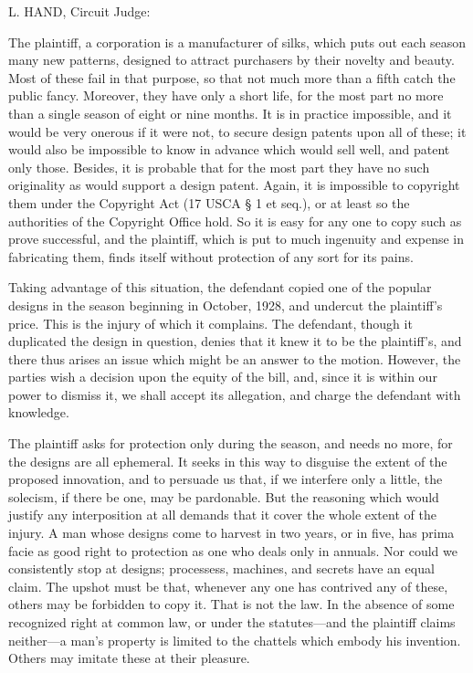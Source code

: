 
\textsc{L. HAND}, Circuit Judge:

The plaintiff, a corporation is a manufacturer of silks, which puts out each
season many new patterns, designed to attract purchasers by their novelty and
beauty.  Most of these fail in that purpose, so that not much more than a fifth
catch the public fancy.  Moreover, they have only a short life, for the most
part no more than a single season of eight or nine months.  It is in practice
impossible, and it would be very onerous if it were not, to secure design
patents upon all of these; it would also be impossible to know in advance which
would sell well, and patent only those.  Besides, it is probable that for the
most part they have no such originality as would support a design patent.
Again, it is impossible to copyright them under the Copyright Act (17 USCA {\S}
1 et seq.), or at least so the authorities of the Copyright Office hold.  So it
is easy for any one to copy such as prove successful, and the plaintiff, which
is put to much ingenuity and expense in fabricating them, finds itself without
protection of any sort for its pains.  

Taking advantage of this situation, the defendant copied one of the popular
designs in the season beginning in October, 1928, and undercut the plaintiff's
price.  This is the injury of which it complains.  The defendant, though it
duplicated the design in question, denies that it knew it to be the
plaintiff's, and there thus arises an issue which might be an answer to the
motion.  However, the parties wish a decision upon the equity of the bill, and,
since it is within our power to dismiss it, we shall accept its allegation, and
charge the defendant with knowledge.  

The plaintiff asks for protection only during the season, and needs no more, for
the designs are all ephemeral.  It seeks in this way to disguise the extent of
the proposed  innovation, and to persuade us that, if we interfere only a
little, the solecism, if there be one, may be pardonable.  But the reasoning
which would justify any interposition at all demands that it cover the whole
extent of the injury.  A man whose designs come to harvest in two years, or in
five, has prima facie as good right to protection as one who deals only in
annuals.  Nor could we consistently stop at designs; processess, machines, and
secrets have an equal claim.  The upshot must be that, whenever any one has
contrived any of these, others may be forbidden to copy it.  That is not the
law.  In the absence of some recognized right at common law, or under the
statutes---and the plaintiff claims neither---a man's property is limited to
the chattels which embody his invention. Others may imitate these at their
pleasure.

